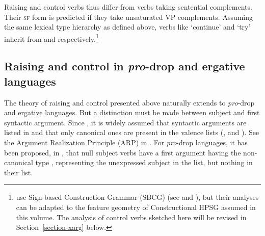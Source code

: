 Raising  and control verbs thus differ from verbs taking sentential complements. Their \textsc{sf} form is
predicted if they take unsaturated VP complements. Assuming the same lexical type hierarchy as
defined above, verbs like  `continue' and  `try' inherit from
 and 
 respectively.\footnote{\citeauthor{HenriandLaurens2011} use Sign-based Construction Grammar (SBCG) (see
   and
  ), but their analyses can be adapted to the
  feature geometry of Constructional HPSG \citep{Sag97a} assumed in this volume. The analysis of
  control verbs sketched here will be revised in Section~\ref{section-xarg} below.}


\subsection{Raising and control in \emph{pro}-drop and ergative languages}

The theory of raising and control presented above naturally extends to \emph{pro}-drop and ergative
languages.  But a distinction must be made between subject and first syntactic argument. Since \citet*{BMS2001a}, it is widely assumed
  that syntactic arguments are listed in \argst and
that only canonical ones are present in the valence lists (\subj, \spr and \comps). See the Argument Realization Principle (ARP) in \crossrefchapterw[\pageref{properties:ex-ARP}]{properties}.
For \emph{pro}-drop languages,
it has been proposed, \eg in \citep[]{ManningandSag1998}, that null subject verbs have
a first argument having the non-canonical  type , representing the unexpressed subject in the \argst list, but nothing in
their \subj list.

